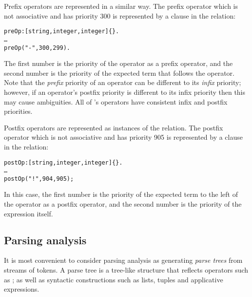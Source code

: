 Prefix operators are represented in a similar way. The prefix operator \function{-} which is not associative and has priority 300 is represented by a clause in the  relation:
\begin{alltt}
preOp:[string,integer,integer]\{\}.
\ldots
preOp("-",300,299).
\end{alltt}
The first number is the priority of the \function{-} operator as a prefix operator, and the second number is the priority of the expected term that follows the operator.  Note that the {\em prefix} priority of an operator can be different to its {\em infix} priority; however, if an operator's postfix priority is different to its infix priority then this may cause ambiguities. All of \go's operators have consistent infix and postfix priorities.

Postfix operators are represented as instances of the  relation. The postfix operator \function{!} which is not associative and has priority 905 is represented by a clause in the  relation:
\begin{alltt}
postOp:[string,integer,integer]\{\}.
\ldots
postOp("!",904,905);
\end{alltt}
In this case, the first number is the priority of the expected term to the left of the \function{!} operator as a postfix operator, and the second number is the priority of the \function{!} expression itself.

\subsection{Parsing analysis}
It is most convenient to consider parsing analysis as generating \emph{parse trees} from streams of tokens.  A parse tree is a tree-like structure that reflects operators such as \function{+}; as well as syntactic constructions such as lists, tuples and applicative expressions.

